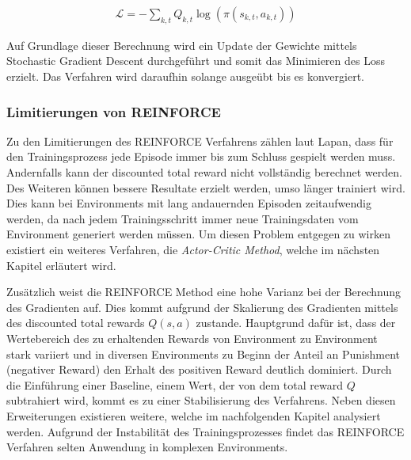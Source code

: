 \documentclass[11pt]{scrartcl}
\begin{document}
\begin{align}
\mathcal{L}=-\sum_{k,t}Q_{k,t}\log(\pi(s_{k,t},a_{k,t}))
\label{aln:reinforce-loss}
\end{align}

Auf Grundlage dieser Berechnung wird ein Update der Gewichte mittels Stochastic
Gradient Descent durchgeführt und somit das Minimieren des Loss erzielt. Das Verfahren
wird daraufhin solange ausgeübt bis es konvergiert.

\subsubsection{Limitierungen von REINFORCE}
\label{sec:limit-reinforce}
Zu den Limitierungen des REINFORCE Verfahrens zählen laut Lapan\cite[~S.252]{L2018}, dass für den
Trainingsprozess jede Episode immer bis zum Schluss gespielt werden muss. Andernfalls kann der
discounted total reward nicht vollständig berechnet werden. Des Weiteren können bessere Resultate
erzielt werden, umso länger trainiert wird. Dies kann bei Environments mit lang andauernden Episoden
zeitaufwendig werden, da nach jedem Trainingsschritt immer neue Trainingsdaten vom Environment
generiert werden müssen. Um diesen Problem entgegen zu wirken existiert ein weiteres Verfahren, die
\textit{Actor-Critic Method}, welche im nächsten Kapitel erläutert wird. 

Zusätzlich weist die REINFORCE Method eine hohe Varianz bei der Berechnung des Gradienten auf.
Dies kommt aufgrund der Skalierung des Gradienten mittels des discounted total rewards $Q(s,a)$ zustande.
Hauptgrund dafür ist, dass der Wertebereich des zu erhaltenden Rewards von Environment zu Environment
stark variiert und in diversen Environments zu Beginn der Anteil an Punishment (negativer Reward) den
Erhalt des positiven Reward deutlich dominiert. Durch die Einführung einer Baseline, einem Wert, der
von dem total reward $Q$ subtrahiert wird, kommt es zu einer Stabilisierung des Verfahrens. Neben
diesen Erweiterungen existieren weitere, welche im nachfolgenden Kapitel analysiert werden. Aufgrund
der Instabilität des Trainingsprozesses findet das REINFORCE Verfahren selten Anwendung in komplexen
Environments.   
\newpage
\end{document}
